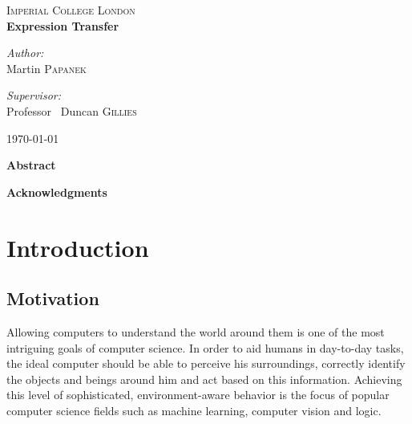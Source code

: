 \documentclass[11pt,a4paper]{report}
\begin{document}
\begin{titlepage}

\begin{center}


\textsc{\LARGE Imperial College London}\\[3.5cm]


{ \huge \bfseries Expression Transfer}\\[5.5cm]



\begin{minipage}{0.4\textwidth}
\begin{flushleft} \large
\emph{Author:}\\
Martin \textsc{Papanek}
\end{flushleft}
\end{minipage}
\begin{minipage}{0.4\textwidth}
\begin{flushright} \large
\emph{Supervisor:} \\
Professor ~Duncan \textsc{Gillies}
\end{flushright}
\end{minipage}

\vfill

{\large \today}

\end{center}

\end{titlepage}

\begin{center}
\LARGE \textbf{Abstract}
\end{center}

\newpage

\begin{center}
\LARGE \textbf{Acknowledgments}
\end{center}



\tableofcontents

\chapter{Introduction}
\section{Motivation}
Allowing computers to understand the world around them is one of the most
intriguing goals of computer science. In order to aid humans in day-to-day
tasks, the ideal computer should be able to perceive his surroundings, correctly identify the objects and beings around him and act based
on this information. Achieving this level of sophisticated, environment-aware
behavior is the focus of popular computer science fields such as machine
learning, computer vision and logic.
\end{document}
